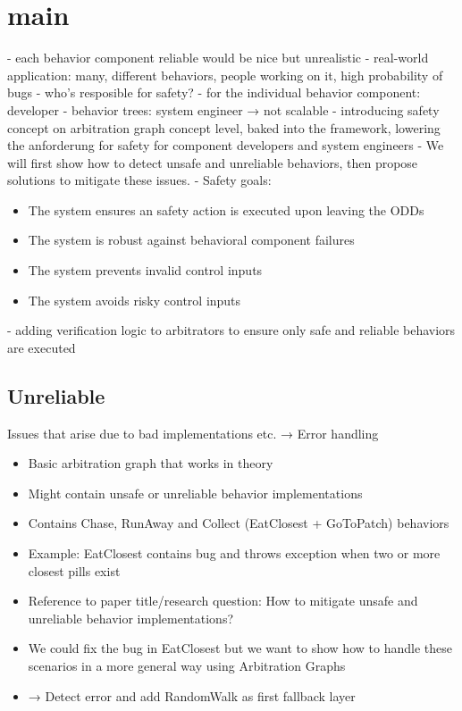 \section{main}

- each behavior component reliable would be nice but unrealistic
- real-world application: many, different behaviors, people working on it, high probability of bugs
- who's resposible for safety?
- for the individual behavior component: developer
- behavior trees: system engineer → not scalable
- introducing safety concept on arbitration graph concept level, baked into the framework, lowering the anforderung for safety for component developers and system engineers
- We will first show how to detect unsafe and unreliable behaviors, then propose solutions to mitigate these issues.
- Safety goals:
\begin{itemize}
    \item The system ensures an safety action is executed upon leaving the ODDs
    \item The system is robust against behavioral component failures
    \item The system prevents invalid control inputs
    \item The system avoids risky control inputs
\end{itemize}
- adding verification logic to arbitrators to ensure only safe and reliable behaviors are executed

\subsection{Unreliable}
Issues that arise due to bad implementations etc. → Error handling
\begin{itemize}
    \item Basic arbitration graph that works in theory
    \item Might contain unsafe or unreliable behavior implementations
    \item Contains Chase, RunAway and Collect (EatClosest + GoToPatch) behaviors
    \item Example: EatClosest contains bug and throws exception when two or more closest pills exist
    \item Reference to paper title/research question: How to mitigate unsafe and unreliable behavior implementations?
    \item We could fix the bug in EatClosest but we want to show how to handle these scenarios in a more general way using Arbitration Graphs
    \item → Detect error and add RandomWalk as first fallback layer
\end{itemize}

